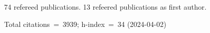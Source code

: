 74 refereed publications. 13 refeered publications as first author.

Total citations~=~3939; h-index~=~34 (2024-04-02)